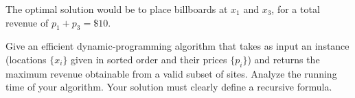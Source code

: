 \documentclass[letterpaper, 11pt]{article}
\begin{document}
The optimal solution would be to place billboards at $x_1$ and $x_3$, for a total revenue of $p_1 +p_3 = \$10$.

Give an efficient dynamic-programming algorithm that takes as input an instance (locations $\{x_i\}$ given in sorted order and their prices $\{p_i\}$) and returns the maximum revenue obtainable from a valid subset of sites. Analyze the running time of your algorithm. Your solution must clearly define a recursive formula.
\end{document}
